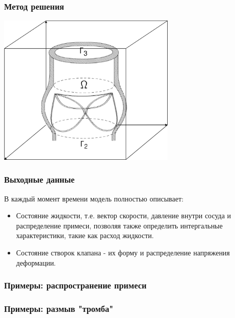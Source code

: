 \documentclass[14pt]{beamer}
\begin{document}
\begin{frame}
\frametitle{Метод решения}
    \begin{center}
        \includegraphics[width=8.5cm]{aorta_valve_scheme_framed.png}
    \end{center}
\end{frame}

\begin{frame}
\frametitle{Выходные данные}
В каждый момент времени модель полностью описывает:

\begin{itemize}
    \item[\MVRightarrow] Состояние жидкости, т.е. вектор скорости, давление
        внутри сосуда и распределение примеси, позволяя также определить
        интергальные характеристики, такие как расход жидкости.
    \item[\MVRightarrow] Состояние створок клапана - их форму и распределение
        напряжения деформации.
\end{itemize}

\end{frame}


\begin{frame}
\frametitle{Примеры: распространение примеси}
\end{frame}

\begin{frame}
\frametitle{Примеры: размыв "тромба"}
\end{frame}
\end{document}
